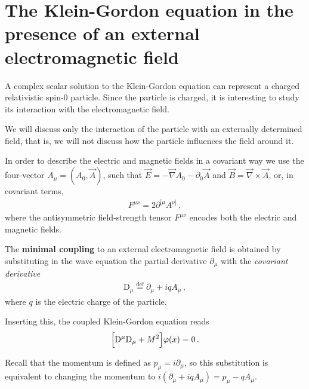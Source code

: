 \documentclass[main.tex]{subfiles}
\begin{document}

\section{The Klein-Gordon equation in the presence of an external electromagnetic field}

A complex scalar solution to the Klein-Gordon equation can represent a charged relativistic spin-0 particle. 
Since the particle is charged, it is interesting to study its interaction with the electromagnetic field.

We will discuss only the interaction of the particle with an externally determined field, that is, we will not discuss how the particle influences the field around it.

In order to describe the electric and magnetic fields in a covariant way we use the four-vector \(A_{\mu } = (A_0 , \vec{A})\), such that \(\vec{E} = - \vec{\nabla} A_0 - \partial_{0} \vec{A}\) and \(\vec{B} = \vec{\nabla} \times \vec{A}\), or, in covariant terms, 
%
\begin{align}
F^{ \mu \nu } = 2\partial^{[\mu } A^{\nu ]}
\,,
\end{align}
%
where the antisymmetric field-strength tensor \(F^{\mu \nu }\) encodes both the electric and magnetic fields. 

\begin{definition}
The \textbf{minimal coupling} to an external electromagnetic field is obtained by substituting in the wave equation the partial derivative \(\partial_{\mu }\) with the \emph{covariant derivative}
%
\begin{align}
\mathrm{D}_{\mu } \overset{\text{def}}{=} \partial_{\mu } + i q A_{\mu }
\,,
\end{align}
%
where \(q\) is the electric charge of the particle. 
\end{definition}

Inserting this, the coupled Klein-Gordon equation reads 
%
\begin{align}
\qty[\mathrm{D}^{\mu } \mathrm{D}_{\mu } + M^2 ] \varphi (x) = 0 
\,.
\end{align}

Recall that the momentum is defined as \(p_{\mu } = i \partial_{\mu }\), so this substitution is equivalent to changing the momentum to \(i (\partial_{\mu } +iqA_{\mu }) =  p_{\mu } - q A_{\mu }\).
\end{document}
